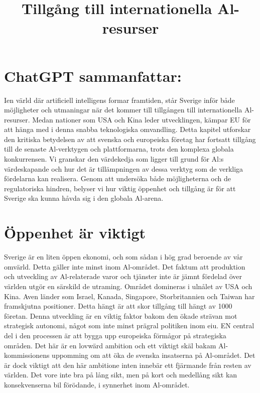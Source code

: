 {{{{{{{{\title{
Tillgång till internationella Al-resurser
}
\section*{ChatGPT sammanfattar:}
Ien värld där artificiell intelligens formar framtiden, står Sverige inför både möjligheter och utmaningar när det kommer till tillgången till internationella Al-resurser. Medan nationer som USA och Kina leder utvecklingen, kämpar EU för att hänga med i denna snabba teknologiska omvandling.
Detta kapitel utforskar den kritiska betydelsen av att svenska och europeiska företag har fortsatt tillgång till de senaste Al-verktygen och plattformarna, trots den komplexa globala konkurrensen. Vi granskar den värdekedja som ligger till grund för Al:s värdeskapande och hur det är tillämpningen av dessa verktyg som de verkliga fördelarna kan realisera. Genom att undersöka både möjligheterna och de regulatoriska hindren, belyser vi hur viktig öppenhet och tillgång är för att Sverige ska kunna håvda sig i den globala Al-arena.
\section*{Öppenhet är viktigt}
Sverige är en liten öppen ekonomi, och som sådan i hög grad beroende av vår omvärld. Detta gäller inte minst inom Al-området. Det faktum att produktion och utveckling av Al-relaterade varor och tjänster inte är jämnt fördelad över världen utgör en särskild de utraming. Området domineras i ulnålet av USA och Kina. Aven länder som Israel, Kanada, Singapore, Storbritannien och Taiwan har framskjutna positioner. Detta hängt är att skor tillgång till hängt av 1000 företan. Denna utveckling är en viktig faktor bakom den ökade strävan mot strategisk autonomi, något som inte minst prägral politiken inom eiu. EN central del i den processen är att bygga upp europeiska förmågor på strategiska områden. Det här är en lovwärd ambition och ett viktigt skäl bakam Al-kommissionens uppomming om att öka de svenska insatserna på Al-området. Det är dock viktigt att den här ambitione inten innebär ett fjärmande från resten av världen. Det vore inte bra på lång sikt, men på kort och medellång sikt kan konsekvenserna bil förödande, i synnerhet inom Al-området.
}}}}}}}}
